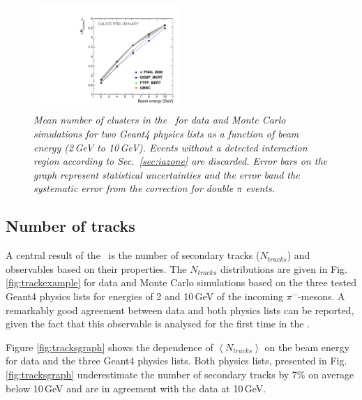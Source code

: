 \begin{figure}[H]
	\centering
	\includegraphics[width=0.5\textwidth]{ECAL/plots/cluster-graph.pdf}
	\caption{\label{fig:clustergraph} \sl Mean number of clusters in the \ecal\ for data and  Monte Carlo simulations for two {\sc Geant}4 physics lists as a function of beam energy (2\,GeV to 10\,GeV). Events without a detected interaction region according to Sec.~\ref{sec:iazone} are discarded. Error bars on the graph represent statistical uncertainties and the error band the systematic error from the correction for double $\pi$ events.}
\end{figure}

\subsection{Number of tracks}
A central result of the \tfa\ is the number of secondary tracks ($N_{tracks}$) and observables based on their properties.
The $N_{tracks}$ distributions are given in Fig. \ref{fig:trackexample} for data and Monte Carlo simulations based on the three tested {\sc Geant4} physics lists for energies of 2 and 10\,GeV of the incoming $\pi^-$-mesons. A remarkably good agreement between data and both physics lists can be reported, given the fact that this observable is analysed for the first time in the \ecal. 

Figure \ref{fig:tracksgraph} shows the dependence of $\left<N_{tracks}\right>$ on the beam energy for data and the three {\sc Geant4} physics lists. 
Both physics lists, presented in Fig.  \ref{fig:tracksgraph} underestimate the number of secondary tracks by 7\% on average below 10\,GeV and are in agreement with the data at 10\,GeV. 

